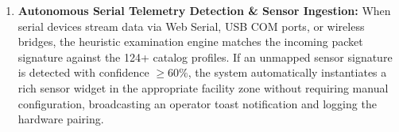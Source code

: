 \documentclass[12pt,a4paper]{article}
\begin{document}
\begin{enumerate}
\begin{itemize}
        \item \textit{AC/DC Power Oscilloscopes \& Breaker Arcs:} Display a continuous scrolling high-voltage AC sinusoidal waveform with electrical spark flashes across circuit breaker contacts.
        \item \textit{Biometric Vital Signs \& Cardiac Monitors:} Feature an illuminated P-Q-R-S-T electrocardiogram (ECG) sweep waveform paired with a rhythmic anatomical heartbeat pulse icon.
        \item \textit{Hydraulic Valves \& Motorized Actuators:} Render a translucent pipeline with active fluid velocity particle dashing and motorized rotary gear rotation.
        \item \textit{Atmospheric Microclimate Thermometers:} Render a dual-column thermometer with dynamic capillary fluid expansion, ambient heat haze shimmer waves, and cooling frost glows.
    \end{itemize}
    
    \item \textbf{Autonomous Serial Telemetry Detection \& Sensor Ingestion:} When serial devices stream data via Web Serial, USB COM ports, or wireless bridges, the heuristic examination engine matches the incoming packet signature against the 124+ catalog profiles. If an unmapped sensor signature is detected with confidence $\ge 60\%$, the system automatically instantiates a rich sensor widget in the appropriate facility zone without requiring manual configuration, broadcasting an operator toast notification and logging the hardware pairing.


\end{enumerate}
\end{document}
